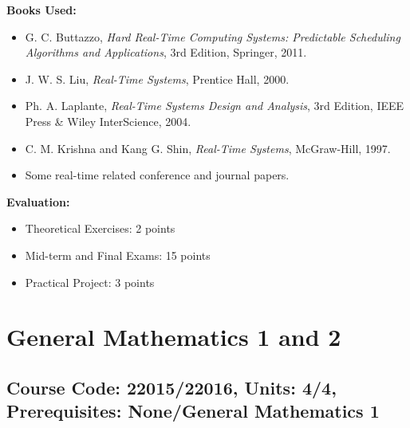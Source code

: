 \documentclass[12pt]{article}
\begin{document}
\textbf{Books Used:}
\begin{itemize}
    \item G. C. Buttazzo, \textit{Hard Real-Time Computing Systems: Predictable Scheduling Algorithms and Applications}, 3rd Edition, Springer, 2011.
    \item J. W. S. Liu, \textit{Real-Time Systems}, Prentice Hall, 2000.
    \item Ph. A. Laplante, \textit{Real-Time Systems Design and Analysis}, 3rd Edition, IEEE Press \& Wiley InterScience, 2004.
    \item C. M. Krishna and Kang G. Shin, \textit{Real-Time Systems}, McGraw-Hill, 1997.
    \item Some real-time related conference and journal papers.
\end{itemize}

\textbf{Evaluation:}
\begin{itemize}
    \item Theoretical Exercises: 2 points
    \item Mid-term and Final Exams: 15 points
    \item Practical Project: 3 points
\end{itemize}

\newpage

\section{General Mathematics 1 and 2}
\subsection*{Course Code: 22015/22016, Units: 4/4, Prerequisites: None/General Mathematics 1}
\end{document}
